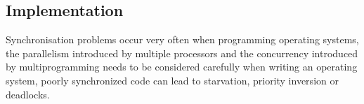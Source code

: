 \documentclass[11pt,a4paper]{article}
\begin{document}
	
	\subsection{Implementation}
	Synchronisation problems occur very often when programming operating systems, the parallelism introduced by multiple processors and the concurrency introduced by multiprogramming needs to be considered carefully when writing an operating system, poorly synchronized code can lead to starvation, priority inversion or deadlocks. \newline
	
	
	
	
	
	\newpage
	
	\printglossaries
	
	
	
\end{document}
